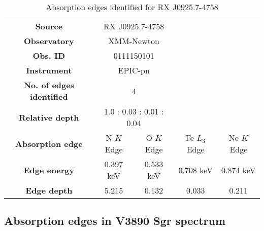 			\renewcommand{\arraystretch}{1.5}
			\begin{table}[!htb]
				\centering
				\caption{Absorption edges identified for RX J0925.7-4758}
				\label{tab:absedge-rx-j0925}
				\begin{tabular}{ccccc}
					\hline
					\textbf{Source} & \multicolumn{2}{c}{RX J0925.7-4758} & {} & {} \\
					\textbf{Observatory} & \multicolumn{2}{c}{XMM-Newton} & {} & {} \\
					\textbf{Obs. ID} & \multicolumn{2}{c}{0111150101} & {} & {} \\
					\textbf{Instrument} & \multicolumn{2}{c}{EPIC-pn} & {} & {} \\
					\textbf{No. of edges identified} & \multicolumn{2}{c}{4} & {} & {} \\
					\textbf{Relative depth} & \multicolumn{2}{c}{1.0 : 0.03 : 0.01 : 0.04} & {} & {} \\ \hline
					\textbf{Absorption edge} & {N $K$ Edge} & {O $K$ Edge} & {Fe $L_3$ Edge} & {Ne $K$ Edge} \\
					\textbf{Edge energy} & {0.397 keV} & {0.533 keV} & {0.708 keV} & {0.874 keV} \\
					\textbf{Edge depth} & {5.215} & {0.132} & {0.033} & {0.211} \\ \hline
				\end{tabular}
			\end{table}
			\renewcommand{\arraystretch}{2.2}
		
		\subsection*{Absorption edges in V3890 Sgr spectrum}
    
%    
%    
